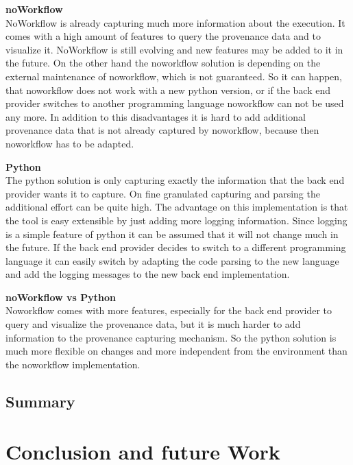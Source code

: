 \documentclass[draft,final]{vutinfth} %
\begin{document}
\textbf{noWorkflow} \\
NoWorkflow is already capturing much more information about the execution. It comes with a high amount of features to query the provenance data and to visualize it. NoWorkflow is still evolving and new features may be added to it in the future. On the other hand the noworkflow solution is depending on the external maintenance of noworkflow, which is not guaranteed. So it can happen, that noworkflow does not work with a new python version, or if the back end provider switches to another programming language noworkflow can not be used any more. In addition to this disadvantages it is hard to add additional provenance data that is not already captured by noworkflow, because then noworkflow has to be adapted.

\textbf{Python} \\
The python solution is only capturing exactly the information that the back end provider wants it to capture. On fine granulated capturing and parsing the additional effort can be quite high. The advantage on this implementation is that the tool is easy extensible by just adding more logging information. Since logging is a simple feature of python it can be assumed that it will not change much in the future. If the back end provider decides to switch to a different programming language it can easily switch by adapting the code parsing to the new language and add the logging messages to the new back end implementation. 

\textbf{noWorkflow vs Python} \\
Noworkflow comes with more features, especially for the back end provider to query and visualize the provenance data, but it is much harder to add information to the provenance capturing mechanism. So the python solution is much more flexible on changes and more independent from the environment than the noworkflow implementation. 

\section{Summary}

\chapter{Conclusion and future Work}\label{Conclusion}
\end{document}
